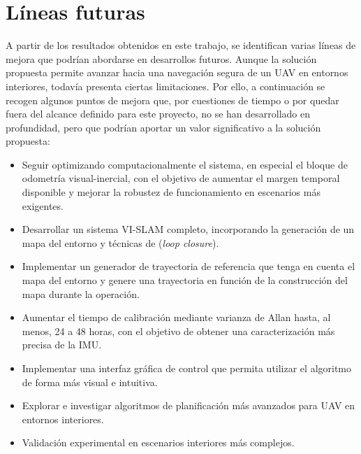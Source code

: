 \section{Líneas futuras}

A partir de los resultados obtenidos en este trabajo, se identifican varias líneas de mejora que podrían abordarse en desarrollos futuros. 
Aunque la solución propuesta permite avanzar hacia una navegación segura de un UAV en entornos interiores, todavía presenta ciertas 
limitaciones. Por ello, a continuación se recogen algunos puntos de mejora que, por cuestiones de tiempo o por quedar fuera del alcance 
definido para este proyecto, no se han desarrollado en profundidad, pero que podrían aportar un valor significativo a la solución propuesta:

\begin{itemize}
    \item Seguir optimizando computacionalmente el sistema, en especial el bloque de odometr\'ia visual-inercial, con el objetivo de aumentar el margen temporal disponible y mejorar la robustez de funcionamiento en escenarios m\'as exigentes.
    \item Desarrollar un sistema VI-SLAM completo, incorporando la generación de un mapa del entorno y técnicas de (\textit{loop closure}).
    \item Implementar un generador de trayectoria de referencia que tenga en cuenta el mapa del entorno y genere una trayectoria en función de la construcción del mapa durante la operación.
    \item Aumentar el tiempo de calibración mediante varianza de Allan hasta, al menos, 24 a 48 horas, con el objetivo de obtener una caracterización más precisa de la IMU.
    \item Implementar una interfaz gráfica de control que permita utilizar el algoritmo de forma más visual e intuitiva.
    \item Explorar e investigar algoritmos de planificación más avanzados para UAV en entornos interiores.
    \item Validación experimental en escenarios interiores más complejos.
\end{itemize}

